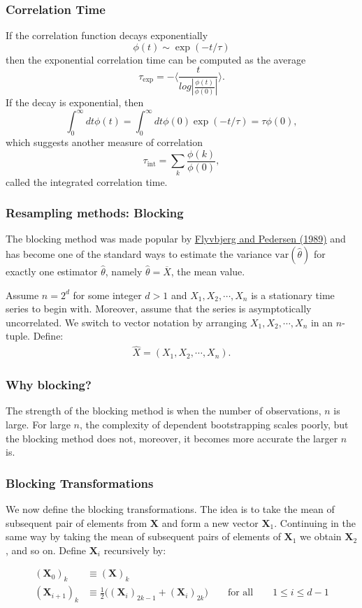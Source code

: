 \documentclass{beamer}
\begin{document}
\begin{frame}
\frametitle{Correlation Time}

\begin{block}{}

If the correlation function decays exponentially
\[ \phi (t) \sim \exp{(-t/\tau)}\]
then the exponential correlation time can be computed as the average
\[   \tau_{\mathrm{exp}}  =  -\langle  \frac{t}{log|\frac{\phi(t)}{\phi(0)}|} \rangle. \]
If the decay is exponential, then
\[  \int_0^{\infty} dt \phi(t)  = \int_0^{\infty} dt \phi(0)\exp{(-t/\tau)}  = \tau \phi(0),\] 
which  suggests another measure of correlation
\[   \tau_{\mathrm{int}} = \sum_k \frac{\phi(k)}{\phi(0)}, \]
called the integrated correlation time.
\end{block}
\end{frame}

\begin{frame}
\frametitle{Resampling methods: Blocking}

The blocking method was made popular by \href{{https://aip.scitation.org/doi/10.1063/1.457480}}{Flyvbjerg and Pedersen (1989)}
and has become one of the standard ways to estimate the variance
$\mathrm{var}(\widehat{\theta})$ for exactly one estimator $\widehat{\theta}$, namely
$\widehat{\theta} = \overline{X}$, the mean value. 

Assume $n = 2^d$ for some integer $d>1$ and $X_1,X_2,\cdots, X_n$ is a stationary time series to begin with. 
Moreover, assume that the series is asymptotically uncorrelated. We switch to vector notation by arranging $X_1,X_2,\cdots,X_n$ in an $n$-tuple. Define:
\begin{align*}
\hat{X} = (X_1,X_2,\cdots,X_n).
\end{align*}
\end{frame}

\begin{frame}
\frametitle{Why blocking?}

The strength of the blocking method is when the number of
observations, $n$ is large. For large $n$, the complexity of dependent
bootstrapping scales poorly, but the blocking method does not,
moreover, it becomes more accurate the larger $n$ is.
\end{frame}

\begin{frame}
\frametitle{Blocking Transformations}

We now define the blocking transformations. The idea is to take the mean of subsequent
pair of elements from $\bm{X}$ and form a new vector
$\bm{X}_1$. Continuing in the same way by taking the mean of
subsequent pairs of elements of $\bm{X}_1$ we obtain $\bm{X}_2$, and
so on. 
Define $\bm{X}_i$ recursively by:

\begin{align} 
(\bm{X}_0)_k &\equiv (\bm{X})_k \nonumber \\
(\bm{X}_{i+1})_k &\equiv \frac{1}{2}\Big( (\bm{X}_i)_{2k-1} +
(\bm{X}_i)_{2k} \Big) \qquad \text{for all} \qquad 1 \leq i \leq d-1
\end{align}
\end{frame}
\end{document}
